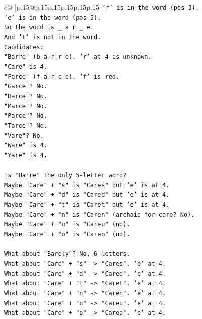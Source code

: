 \documentclass{article}
\begin{document}
{\begin{supertabular}{c@{$\;$}|p{.15\linewidth}@{}p{.15\linewidth}p{.15\linewidth}p{.15\linewidth}p{.15\linewidth}p{.15\linewidth}}
{{{\texttt{'r' is in the word (pos 3).} \\
\texttt{'e' is in the word (pos 5).} \\
\texttt{So the word is \_ a r \_ e.} \\
\texttt{And 't' is not in the word.} \\
\texttt{Candidates:} \\
\texttt{"Barre" (b{-}a{-}r{-}r{-}e). 'r' at 4 is unknown.} \\
\texttt{"Care" is 4.} \\
\texttt{"Farce" (f{-}a{-}r{-}c{-}e). 'f' is red.} \\
\texttt{"Garce"? No.} \\
\texttt{"Harce"? No.} \\
\texttt{"Marce"? No.} \\
\texttt{"Parce"? No.} \\
\texttt{"Tarce"? No.} \\
\texttt{"Vare"? No.} \\
\texttt{"Ware" is 4.} \\
\texttt{"Yare" is 4.} \\
\\ 
\texttt{Is "Barre" the only 5{-}letter word?} \\
\texttt{Maybe "Care" + "s" is "Cares" but 'e' is at 4.} \\
\texttt{Maybe "Care" + "d" is "Cared" but 'e' is at 4.} \\
\texttt{Maybe "Care" + "t" is "Caret" but 'e' is at 4.} \\
\texttt{Maybe "Care" + "n" is "Caren" (archaic for care? No).} \\
\texttt{Maybe "Care" + "u" is "Careu" (no).} \\
\texttt{Maybe "Care" + "o" is "Careo" (no).} \\
\\ 
\texttt{What about "Barely"? No, 6 letters.} \\
\texttt{What about "Care" + "s" {-}> "Cares". 'e' at 4.} \\
\texttt{What about "Care" + "d" {-}> "Cared". 'e' at 4.} \\
\texttt{What about "Care" + "t" {-}> "Caret". 'e' at 4.} \\
\texttt{What about "Care" + "n" {-}> "Caren". 'e' at 4.} \\
\texttt{What about "Care" + "u" {-}> "Careu". 'e' at 4.} \\
\texttt{What about "Care" + "o" {-}> "Careo". 'e' at 4.} \\
}}}
\end{supertabular}}
\end{document}
